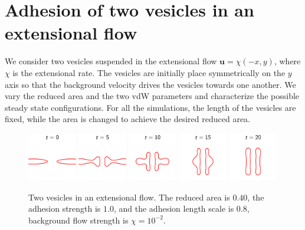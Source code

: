 \documentclass[%
preprint,
 amsmath,amssymb,
 aps,
]{revtex4-1}
\newcommand{\uu}{\mathbf{u}}
\begin{document}
\section{Adhesion of two vesicles in an extensional flow} 
\label{sec:eflow} 
We consider two vesicles suspended in the extensional flow $\uu =
\chi(-x,y)$, where $\chi$ is the extensional rate.  The vesicles are
initially place symmetrically on the $y$ axis so that the background
velocity drives the vesicles towards one another.  We vary the reduced
area and the two vdW parameters and characterize the possible steady
state configurations.  For all the simulations, the length of the
vesicles are fixed, while the area is changed to achieve the desired
reduced area.

\begin{figure}[htp]
  \includegraphics[width = 0.19\textwidth]{figs/extensional_adR8em1adS1e0_ra040_timestep1.pdf}
  \includegraphics[width = 0.19\textwidth]{figs/extensional_adR8em1adS1e0_ra040_timestep2.pdf}
  \includegraphics[width = 0.19\textwidth]{figs/extensional_adR8em1adS1e0_ra040_timestep3.pdf}
  \includegraphics[width = 0.19\textwidth]{figs/extensional_adR8em1adS1e0_ra040_timestep4.pdf}
  \includegraphics[width = 0.19\textwidth]{figs/extensional_adR8em1adS1e0_ra040_timestep5.pdf}
  \caption{Two vesicles in an extensional flow.  The reduced area is
  $0.40$, the adhesion strength is $1.0$, and the adhesion length scale
is $0.8$, background flow strength is $\chi = 10^{-2}$.}
\end{figure}
\end{document}
